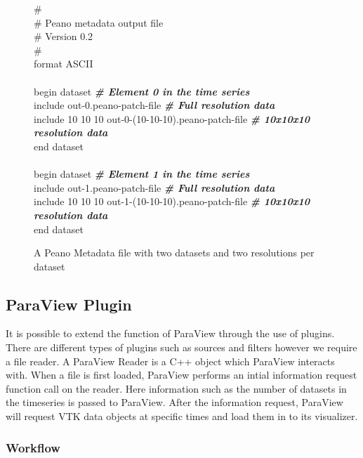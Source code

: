 \documentclass[12pt,a4paper]{article}
\begin{document}
\begin{figure}[h]
\begin{tcolorbox}
\# \\
\# Peano metadata output file \\
\# Version 0.2 \\
\# \\
format ASCII \\
\\
begin dataset \textbf{\textit{\# Element 0 in the time series}} \\
\null\quad include out-0.peano-patch-file \textbf{\textit{\# Full resolution data}} \\
\null\quad include 10 10 10 out-0-(10-10-10).peano-patch-file \textbf{\textit{\# 10x10x10 resolution data}} \\
end dataset \\
 \\
begin dataset \textbf{\textit{\# Element 1 in the time series}} \\
\null\quad include out-1.peano-patch-file \textbf{\textit{\# Full resolution data}} \\
\null\quad include 10 10 10 out-1-(10-10-10).peano-patch-file \textbf{\textit{\# 10x10x10 resolution data}} \\
end dataset
\end{tcolorbox}
\caption{A Peano Metadata file with two datasets and two resolutions per dataset}
\label{metadata-new}
\end{figure}

\subsection{ParaView Plugin}
It is possible to extend the function of ParaView through the use of plugins. There are different types of plugins such as sources and filters however we require a file reader. A ParaView Reader is a C++ object which ParaView interacts with. When a file is first loaded, ParaView performs an intial information request function call on the reader. Here information such as the number of datasets in the timeseries is passed to ParaView. After the information request, ParaView will request VTK data objects at specific times and load them in to its visualizer.

\subsubsection{Workflow}
\end{document}
